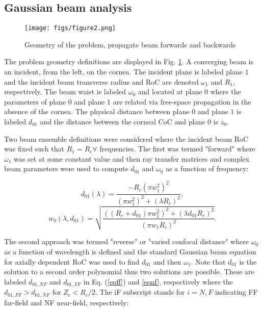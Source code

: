 \documentclass{osa-article}
\begin{document}
\subsection{Gaussian beam analysis}

\begin{figure}[b]
\centering
\texttt{[image: figs/figure2.png]}
\caption{Geometry of the problem, propagate beam forwards and backwards
}\label{describe}
\end{figure}


The problem geometry definitions are displayed in Fig. \ref{describe}. A converging beam is an incident, from the left, on the cornea. The incident plane is labeled plane $1$ and the incident beam transverse radius and RoC are denoted $\omega_1$ and $R_1$, respectively. The beam waist is labeled $\omega_0$ and located at plane $0$ where the parameters of plane $0$ and plane $1$ are related via free-space propagation in the absence of the cornea. The physical distance between plane $0$ and plane $1$ is labeled $d_{01}$ and the distance between the corneal CoC and plane $0$ is $z_0$. 


Two beam ensemble definitions were considered where the incident beam RoC was fixed such that $R_1= R_c \forall$ frequencies. The first was termed "forward" where $\omega_1$ was set at some constant value and then ray transfer matrices and complex beam parameters were used to compute $d_{01}$ and $\omega_0$ as a function of frequency:

\begin{equation}\label{eq1}
d_{01}(\lambda)=\frac{-R_c(\pi w_1^2)^2}{(\pi w_1^2)^2+(\lambda R_c)^2},
\end{equation}
\begin{equation}\label{eq2}
w_0(\lambda,d_{01})=\sqrt{\frac{((R_c+d_{01})\pi w_1^2)^2+(\lambda d_{01}R_c)^2}{(\pi w_1R_c)^2}}.
\end{equation}

The second approach was termed "reverse" or "varied confocal distance" where $\omega_0$ as a function of wavelength is defined and the standard Gaussian beam equation for axially dependent RoC was used to find $d_{01}$ and then $\omega_1$. Note that $d_{01}$ is the solution to a second order polynomial thus two solutions are possible. These are labeled $d_{01,NF}$ and $d_{01,FF}$ in Eq. (\ref{eqff}) and \ref{eqnf}, respectively where the $d_{01,FF} > d_{01,NF}$ for $Z_c<R_c/2$. The iF subscript stands for $i=N,F$ indicating FF far-field and NF near-field, respectively:
\end{document}
